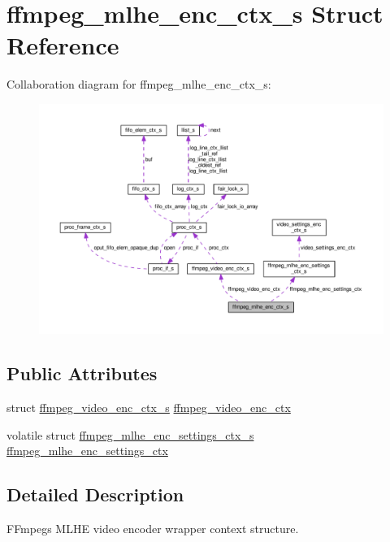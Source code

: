 \hypertarget{structffmpeg__mlhe__enc__ctx__s}{}\section{ffmpeg\+\_\+mlhe\+\_\+enc\+\_\+ctx\+\_\+s Struct Reference}
\label{structffmpeg__mlhe__enc__ctx__s}


Collaboration diagram for ffmpeg\+\_\+mlhe\+\_\+enc\+\_\+ctx\+\_\+s\+:\nopagebreak
\begin{figure}[H]
\begin{center}
\leavevmode
\includegraphics[width=350pt]{structffmpeg__mlhe__enc__ctx__s__coll__graph}
\end{center}
\end{figure}
\subsection*{Public Attributes}
\begin{DoxyCompactItemize}
\item 
struct \hyperlink{structffmpeg__video__enc__ctx__s}{ffmpeg\+\_\+video\+\_\+enc\+\_\+ctx\+\_\+s} \hyperlink{structffmpeg__mlhe__enc__ctx__s_adce7c38297d2c5b099ef78994f06e389}{ffmpeg\+\_\+video\+\_\+enc\+\_\+ctx}
\item 
volatile struct \hyperlink{structffmpeg__mlhe__enc__settings__ctx__s}{ffmpeg\+\_\+mlhe\+\_\+enc\+\_\+settings\+\_\+ctx\+\_\+s} \hyperlink{structffmpeg__mlhe__enc__ctx__s_aa3fe9ce12475adac61b8d05b0f03e743}{ffmpeg\+\_\+mlhe\+\_\+enc\+\_\+settings\+\_\+ctx}
\end{DoxyCompactItemize}


\subsection{Detailed Description}
F\+Fmpeg\textquotesingle{}s M\+L\+HE video encoder wrapper context structure. 

